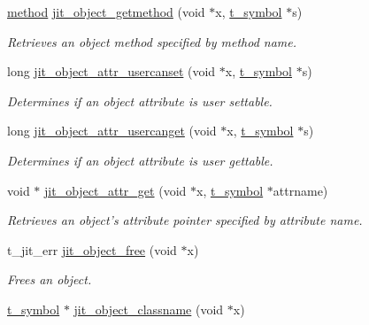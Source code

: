 \begin{DoxyCompactItemize}
\hyperlink{group__datatypes_gac26ba0a173b50597f5738132e059b42d}{method} \hyperlink{group__objectmod_gaeba4eb06443064c2cb4b9c45edeb7ab2}{jit\_\-object\_\-getmethod} (void $\ast$x, \hyperlink{structt__symbol}{t\_\-symbol} $\ast$s)
\begin{DoxyCompactList}\small\item\em Retrieves an object method specified by method name. \item\end{DoxyCompactList}\item 
long \hyperlink{group__objectmod_gab5c10166fd7e2505b76a25e1cf0b6b09}{jit\_\-object\_\-attr\_\-usercanset} (void $\ast$x, \hyperlink{structt__symbol}{t\_\-symbol} $\ast$s)
\begin{DoxyCompactList}\small\item\em Determines if an object attribute is user settable. \item\end{DoxyCompactList}\item 
long \hyperlink{group__objectmod_ga03b2bb6645b076c4afbba3efbd5f14b9}{jit\_\-object\_\-attr\_\-usercanget} (void $\ast$x, \hyperlink{structt__symbol}{t\_\-symbol} $\ast$s)
\begin{DoxyCompactList}\small\item\em Determines if an object attribute is user gettable. \item\end{DoxyCompactList}\item 
void $\ast$ \hyperlink{group__objectmod_ga6d62c09fe37fc74bcaaa6ab326064b6f}{jit\_\-object\_\-attr\_\-get} (void $\ast$x, \hyperlink{structt__symbol}{t\_\-symbol} $\ast$attrname)
\begin{DoxyCompactList}\small\item\em Retrieves an object's attribute pointer specified by attribute name. \item\end{DoxyCompactList}\item 
t\_\-jit\_\-err \hyperlink{group__objectmod_ga64970b62e5afe7a2cbd57efd6e9e9f74}{jit\_\-object\_\-free} (void $\ast$x)
\begin{DoxyCompactList}\small\item\em Frees an object. \item\end{DoxyCompactList}\item 
\hyperlink{structt__symbol}{t\_\-symbol} $\ast$ \hyperlink{group__objectmod_ga2d3302646e6bf59b4960dd0656632095}{jit\_\-object\_\-classname} (void $\ast$x)

\end{DoxyCompactItemize}
